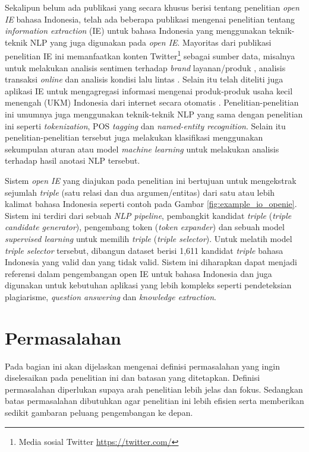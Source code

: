 Sekalipun belum ada publikasi yang secara khusus berisi tentang penelitian \textit{open IE} bahasa Indonesia, telah ada beberapa publikasi mengenai penelitian tentang \textit{information extraction} (IE) untuk bahasa Indonesia yang menggunakan teknik-teknik NLP yang juga digunakan pada \textit{open IE}. Mayoritas dari publikasi penelitian IE ini memanfaatkan konten Twitter\footnote{Media sosial Twitter \url{https://twitter.com/}} sebagai sumber data, misalnya untuk melakukan analisis sentimen terhadap \textit{brand} layanan/produk \citep{vidya2015twitter}, analisis transaksi \textit{online} \citep{khodra2013ekstraksi} dan analisis kondisi lalu lintas \citep{hanifah2014twitter, endarnoto2011traffic}. Selain itu telah diteliti juga aplikasi IE untuk mengagregasi informasi mengenai produk-produk usaha kecil menengah (UKM) Indonesia dari internet secara otomatis \citep{oktavino2014information}. Penelitian-penelitian ini umumnya juga menggunakan teknik-teknik NLP yang sama dengan penelitian ini seperti \textit{tokenization}, POS \textit{tagging} dan \textit{named-entity recognition}. Selain itu penelitian-penelitian tersebut juga melakukan klasifikasi menggunakan sekumpulan aturan \citep{endarnoto2011traffic} atau model \textit{machine learning} \citep{oktavino2014information, vidya2015twitter, khodra2013ekstraksi} untuk melakukan analisis terhadap hasil anotasi NLP tersebut.

Sistem \textit{open IE} yang diajukan pada penelitian ini bertujuan untuk mengekstrak sejumlah \textit{triple} (satu relasi dan dua argumen/entitas) dari satu atau lebih kalimat bahasa Indonesia seperti contoh pada Gambar \ref{fig:example_io_openie}. Sistem ini terdiri dari sebuah \textit{NLP pipeline}, pembangkit kandidat \textit{triple} (\textit{triple candidate generator}), pengembang token (\textit{token expander}) dan sebuah model \textit{supervised learning} untuk memilih \textit{triple} (\textit{triple selector}). Untuk melatih model \textit{triple selector} tersebut, dibangun dataset berisi 1,611 kandidat \textit{triple} bahasa Indonesia yang valid dan yang tidak valid. Sistem ini diharapkan dapat menjadi referensi dalam pengembangan open IE untuk bahasa Indonesia dan juga digunakan untuk kebutuhan aplikasi yang lebih kompleks seperti pendeteksian plagiarisme, \textit{question answering} dan \textit{knowledge extraction}.

\section{Permasalahan}
Pada bagian ini akan dijelaskan mengenai definisi permasalahan yang ingin diselesaikan pada penelitian ini dan batasan yang ditetapkan. Definisi permasalahan diperlukan supaya arah penelitian lebih jelas dan fokus. Sedangkan batas permasalahan dibutuhkan agar penelitian ini lebih efisien serta memberikan sedikit gambaran peluang pengembangan ke depan.

